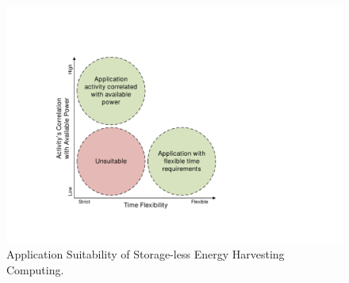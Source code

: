 \begin{figure}[!htb]
  \centering
  \includegraphics[width=12cm]{figure/intro/appsuit2}
  \caption{Application Suitability of Storage-less Energy Harvesting Computing.}
  \label{Figure:appsuit}
\end{figure}




